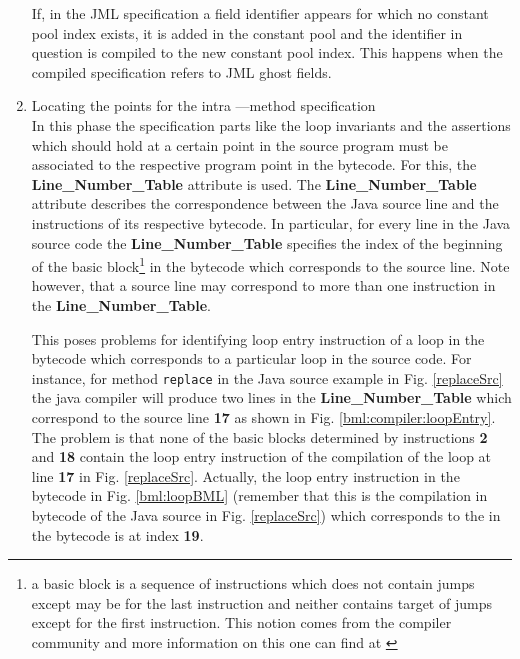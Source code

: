 \begin{enumerate}
      If, in the JML specification a field
      identifier appears for which no constant pool index exists, it is added in the constant pool and the identifier in question
      is compiled to the new constant pool index. This happens when the compiled specification refers to
 JML ghost fields.
     

  





      

\item Locating the points for the intra ---method specification \\

      In this phase the specification parts like the loop invariants and the assertions
      which should hold at a certain point in the source program must be associated to the
      respective program point in the bytecode.
      For this, the \textbf{Line\_Number\_Table} attribute is used. The \textbf{Line\_Number\_Table} attribute
      describes the correspondence between the Java source line and the instructions of its respective bytecode.
      In particular, for every line in the Java source code the   \textbf{Line\_Number\_Table}  specifies the index 
      of the beginning of the basic block\footnote{a basic block is a sequence of instructions which does not contain jumps except
	may be for the last instruction and neither contains target of jumps except for the first instruction. 
	This notion comes from the compiler community and 
	more information on this one can find at \cite{ARUCom1986}} in the bytecode which corresponds to the source line. 
      Note however, that a source line may correspond to more than one instruction in the \textbf{Line\_Number\_Table}. 
     
      This poses problems for  identifying loop entry instruction of a loop in the bytecode
      which corresponds to a particular loop in the source  code. %
       For instance, for method \texttt{replace} in
      the Java source example in Fig. \ref{replaceSrc} the java compiler will  produce two lines in the 
       \textbf{Line\_Number\_Table} which correspond to the source line \textbf{17}  as shown in Fig. \ref{bml:compiler:loopEntry}.
       The problem is that none of the basic blocks determined by instructions  \textbf{2} and  \textbf{18} contain the loop entry instruction of the compilation
       of the loop at line \textbf{17} in Fig. \ref{replaceSrc}. Actually, the loop entry instruction in the bytecode in 
       Fig. \ref{bml:loopBML} (remember that this is the compilation in bytecode of the Java source in Fig. \ref{replaceSrc}) which corresponds to the 
       in the bytecode is at index \textbf{19}.
  

\end{enumerate}
